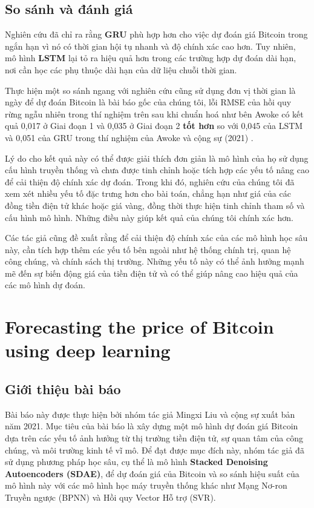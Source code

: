\subsection{So sánh và đánh giá}
Nghiên cứu đã chỉ ra rằng \textbf{GRU} phù hợp hơn cho việc dự đoán giá Bitcoin trong ngắn hạn vì nó có thời gian hội tụ nhanh và độ chính xác cao hơn. Tuy nhiên, mô hình \textbf{LSTM} lại tỏ ra hiệu quả hơn trong các trường hợp dự đoán dài hạn, nơi cần học các phụ thuộc dài hạn của dữ liệu chuỗi thời gian.

Thực hiện một so sánh ngang với nghiên cứu cũng sử dụng đơn vị thời gian là ngày để dự đoán Bitcoin là bài báo gốc của chúng tôi, lỗi RMSE của hồi quy rừng ngẫu nhiên trong thí nghiệm trên sau khi chuẩn hoá như bên Awoke có kết quả 0,017 ở Giai đoạn 1 và 0,035 ở Giai đoạn 2 \textbf{tốt hơn} so với 0,045 của LSTM và 0,051 của GRU trong thí nghiệm của Awoke và cộng sự (2021) \cite{5}.

Lý do cho kết quả này có thể được giải thích đơn giản là mô hình của họ sử dụng cấu hình truyền thống và chưa được tinh chỉnh hoặc tích hợp các yếu tố nâng cao để cải thiện độ chính xác dự đoán. Trong khi đó, nghiên cứu của chúng tôi đã xem xét nhiều yếu tố đặc trưng hơn cho bài toán, chẳng hạn như giá của các đồng tiền điện tử khác hoặc giá vàng, đồng thời thực hiện tinh chỉnh tham số và cấu hình mô hình. Những điều này giúp kết quả của chúng tôi chính xác hơn.

Các tác giả cũng đề xuất rằng để cải thiện độ chính xác của các mô hình học sâu này, cần tích hợp thêm các yếu tố bên ngoài như hệ thống chính trị, quan hệ công chúng, và chính sách thị trường. Những yếu tố này có thể ảnh hưởng mạnh mẽ đến sự biến động giá của tiền điện tử và có thể giúp nâng cao hiệu quả của các mô hình dự đoán.

\section{Forecasting the price of Bitcoin using deep learning}
\subsection{Giới thiệu bài báo}
Bài báo này được thực hiện bởi nhóm tác giả Mingxi Liu và cộng sự xuất bản năm 2021. Mục tiêu của bài báo là xây dựng một mô hình dự đoán giá Bitcoin dựa trên các yếu tố ảnh hưởng từ thị trường tiền điện tử, sự quan tâm của công chúng, và môi trường kinh tế vĩ mô. Để đạt được mục đích này, nhóm tác giả đã sử dụng phương pháp học sâu, cụ thể là mô hình \textbf{Stacked Denoising Autoencoders (SDAE)}, để dự đoán giá của Bitcoin và so sánh hiệu suất của mô hình này với các mô hình học máy truyền thống khác như Mạng Nơ-ron Truyền ngược (BPNN) và Hồi quy Vector Hỗ trợ (SVR). 

